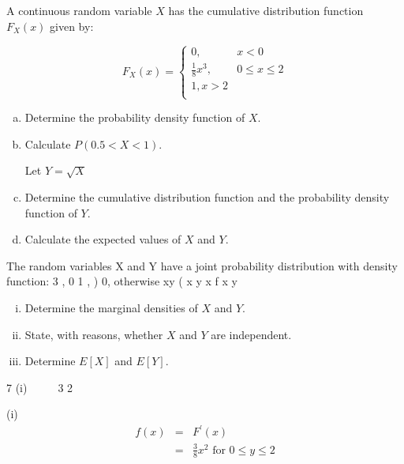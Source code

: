 \documentclass[a4paper,12pt]{article}
\begin{document}


\noindent A continuous random variable $X$ has the cumulative distribution function $F_X(x)$ given
by:


\[ F_X(x) = \begin{cases}
0, & x <0 \\
\frac{1}{8}x^3 , & 0 \leq x \leq 2\\
1, x > 2 \\
\end{cases}\]

\begin{enumerate}[(a)]
\item Determine the probability density function of $X$. 
\item Calculate $P(0.5 <X< 1)$.

Let $Y =  \sqrt{X}$

\item Determine the cumulative distribution function and the probability density
function of $Y$. 
\item Calculate the expected values of $X$ and $Y$. 
\end{enumerate}
\item The random variables X and Y have a joint probability distribution with density
function:
  3 , 0 1
, )
0, otherwise
xy (
  x y x
  f x y
     
  
  
  
\begin{enumerate}[(i)]
\item Determine the marginal densities of $X$ and $Y$. 
\item State, with reasons, whether $X$ and $Y$ are independent. 
\item Determine $E[X]$ and $E[Y]$. 
\end{enumerate}
  
  7 (i)     3 2


(i) 
\begin{eqnarray*}
f ( x ) &=& F ^{\prime} ( x ) \\  
&=& \frac{3}{8} x^2 \mbox{ for } 0 \leq y \leq 2
\end{eqnarray*}
\end{document}
